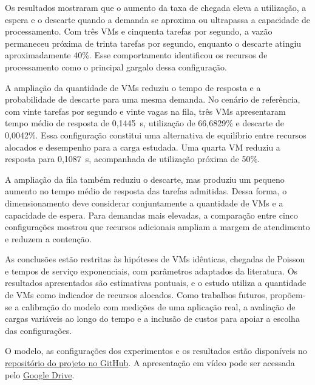 \documentclass[conference]{IEEEtran}
\begin{document}
Os resultados mostraram que o aumento da taxa de chegada
eleva a utilização, a espera e o descarte quando a demanda
se aproxima ou ultrapassa a capacidade de processamento.
Com três VMs e cinquenta tarefas por segundo, a vazão
permaneceu próxima de trinta tarefas por segundo,
enquanto o descarte atingiu aproximadamente 40\%.
Esse comportamento identificou os recursos de
processamento como o principal gargalo dessa configuração.

A ampliação da quantidade de VMs reduziu o tempo de
resposta e a probabilidade de descarte para uma mesma
demanda. No cenário de referência, com vinte tarefas
por segundo e vinte vagas na fila, três VMs apresentaram
tempo médio de resposta de 0,1445~s, utilização de
66,6829\% e descarte de 0,0042\%. Essa configuração
constitui uma alternativa de equilíbrio entre recursos
alocados e desempenho para a carga estudada. Uma quarta
VM reduziu a resposta para 0,1087~s, acompanhada de
utilização próxima de 50\%.

A ampliação da fila também reduziu o descarte, mas
produziu um pequeno aumento no tempo médio de resposta
das tarefas admitidas. Dessa forma, o dimensionamento
deve considerar conjuntamente a quantidade de VMs
e a capacidade de espera. Para demandas mais elevadas,
a comparação entre cinco configurações mostrou que
recursos adicionais ampliam a margem de atendimento
e reduzem a contenção.

As conclusões estão restritas às hipóteses de VMs
idênticas, chegadas de Poisson e tempos de serviço
exponenciais, com parâmetros adaptados da literatura.
Os resultados apresentados são estimativas pontuais,
e o estudo utiliza a quantidade de VMs como indicador
de recursos alocados. Como trabalhos futuros,
propõem-se a calibração do modelo com medições de
uma aplicação real, a avaliação de cargas variáveis
ao longo do tempo e a inclusão de custos para apoiar
a escolha das configurações.


O modelo, as configurações dos experimentos e os resultados
estão disponíveis no \href{https://github.com/RaisSousaa/Trabalho07-SD}{repositório do projeto no GitHub}.
A apresentação em vídeo pode ser acessada pelo
\href{https://drive.google.com/file/d/1r0zUEZ-HTNkOxSzZm_K4DD1HS4JBRgOu/view?usp=sharing}{Google Drive}.



\end{document}

